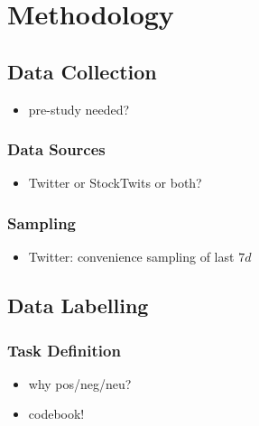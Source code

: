 \section{Methodology}
\subsection{Data Collection}
\begin{itemize}[noitemsep]
	\item pre-study needed?
\end{itemize}

\subsubsection{Data Sources}
\begin{itemize}[noitemsep]
	\item Twitter or StockTwits or both?
\end{itemize}





\subsubsection{Sampling}
\begin{itemize}[noitemsep]
	\item Twitter: convenience sampling of last $7d$
\end{itemize}


\subsection{Data Labelling}

\subsubsection{Task Definition}
\begin{itemize}[noitemsep]
	\item why pos/neg/neu?
	\item codebook!
\end{itemize}



